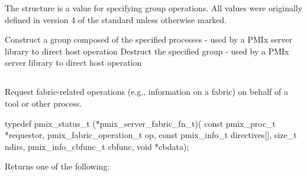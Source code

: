The  structure is a  value for specifying group operations. All values were originally defined in version 4 of the standard unless otherwise marked.

\begin{constantdesc}
%
Construct a group composed of the specified processes - used by a \ac{PMIx} server library to direct host operation
%
Destruct the specified group - used by a \ac{PMIx} server library to direct host operation
%
\end{constantdesc}


\subsection{}

\summary

Request fabric-related operations (e.g., information on a fabric) on behalf of a tool or other process.

\format

\cspecificstart
\begin{codepar}
typedef pmix_status_t (*pmix_server_fabric_fn_t)(
                           const pmix_proc_t *requestor,
                           pmix_fabric_operation_t op,
                           const pmix_info_t directives[],
                           size_t ndirs,
                           pmix_info_cbfunc_t cbfunc, void *cbdata);
\end{codepar}
\cspecificend

\begin{arglist}
\end{arglist}

Returns one of the following:

